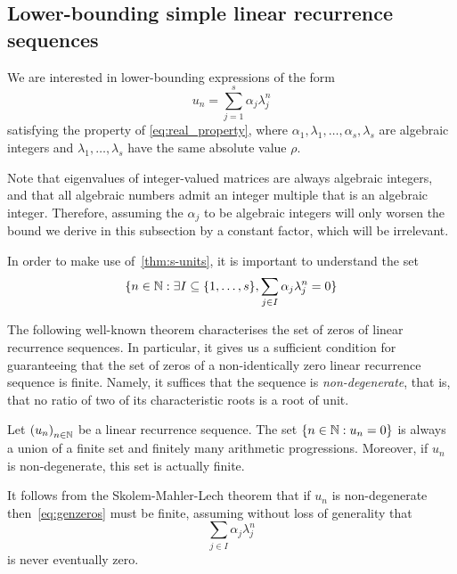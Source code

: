 \subsection{Lower-bounding simple linear recurrence sequences}
\label{sec:s-units-app}

We are interested in lower-bounding expressions of the form
\begin{equation}
\label{eq:sum}
u_{n}=\sum\limits_{j=1}^{s}\alpha_{j}\lambda_j^{n}
\end{equation}
satisfying the property of \cref{eq:real_property}, where $\alpha_{1}, \lambda_{1}, \ldots, \alpha_{s}, \lambda_{s}$ are algebraic integers and $\lambda_{1},\ldots,\lambda_{s}$ have the same absolute value $\rho$.

Note that eigenvalues of integer-valued matrices are always algebraic integers, and that all algebraic numbers admit an integer multiple that is an algebraic integer. Therefore, assuming the $\alpha_{j}$ to be algebraic integers will only worsen the bound we derive in this subsection by a constant factor, which will be irrelevant.

In order to make use of~\cref{thm:s-units}, it is important to understand the set
\begin{equation}
\lbrace n\in\Naturals: \exists I\subseteq \lbrace 1,\ldots,s\rbrace, \sum\limits_{j\in I}\alpha_j\lambda_j^n=0\rbrace
\label{eq:genzeros}
\end{equation}

The following well-known theorem characterises the set of zeros of linear recurrence sequences. In particular, it gives us a sufficient condition for guaranteeing that the set of zeros of a non-identically zero linear recurrence sequence is finite. Namely, it suffices that the sequence is \emph{non-degenerate}, that is, that no ratio of two of its characteristic roots is a root of unit.

\begin{theorem}
Let ${(u_{n})}_{n \in \mathbb{N}}$ be a linear recurrence sequence. The set $\lbrace n\in\mathbb{N}: u_n=0\rbrace$ is always a union of a finite set and finitely many arithmetic progressions. Moreover, if $u_n$ is non-degenerate, this set is actually finite.
\end{theorem}

It follows from the Skolem-Mahler-Lech theorem that if $u_n$ is non-degenerate  then~\eqref{eq:genzeros} must be finite, assuming without loss of generality that
\begin{equation*}
\sum\limits_{j\in I}\alpha_j\lambda_j^n
\end{equation*}
is never eventually zero.

